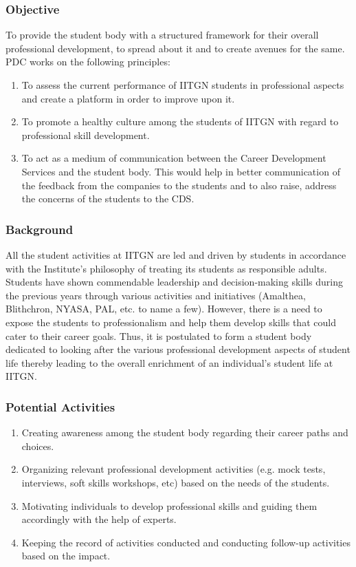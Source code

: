 \documentclass[12pt]{article}
\begin{document}
\subsubsection{Objective}
To provide the student body with a structured framework for their overall professional development, to spread about it and to create avenues for the same. PDC works on the following principles:
\begin{enumerate}
    \item To assess the current performance of IITGN students in professional aspects and create a platform in order to improve upon it.
    \item To promote a healthy culture among the students of IITGN with regard to professional skill development.
    \item To act as a medium of communication between the Career Development Services and the student body. This would help in better communication of the feedback from the companies to the students and to also raise, address the concerns of the students to the CDS.
\end{enumerate}

\subsubsection{Background}
All the student activities at IITGN are led and driven by students in
accordance with the Institute's philosophy of treating its students as responsible adults. Students have shown commendable leadership and
decision-making skills during the previous years through various activities and initiatives (Amalthea, Blithchron, NYASA, PAL, etc. to name a few). However, there is a need to expose the students to professionalism and help them develop skills that could cater to their career goals. Thus, it is postulated to form a student body dedicated to looking after the various professional development aspects of student life thereby leading to the overall enrichment of an individual's student life at IITGN.


\subsubsection{Potential Activities}
\begin{enumerate}
    \item Creating awareness among the student body regarding their career paths and choices.
    \item Organizing relevant professional development activities (e.g. mock tests, interviews, soft skills workshops, etc) based on the needs of the students.
    \item Motivating individuals to develop professional skills and guiding them accordingly with the help of experts.
    \item Keeping the record of activities conducted and conducting follow-up activities based on the impact.
\end{enumerate}
\end{document}
